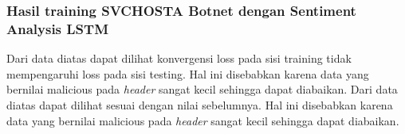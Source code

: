 \documentclass[./skripsi.tex]{subfiles}
\begin{document}
\subsubsection{Hasil training SVCHOSTA Botnet dengan Sentiment Analysis LSTM}
\label{svc_loss}
Dari data diatas dapat dilihat konvergensi loss pada sisi training tidak mempengaruhi loss pada sisi testing. Hal ini disebabkan karena data yang bernilai malicious pada \textit{header} sangat kecil sehingga dapat diabaikan.
\label{svc_acc}
Dari data diatas dapat dilihat sesuai dengan nilai sebelumnya. Hal ini disebabkan karena data yang bernilai malicious pada \textit{header} sangat kecil sehingga dapat diabaikan.
\end{document}
